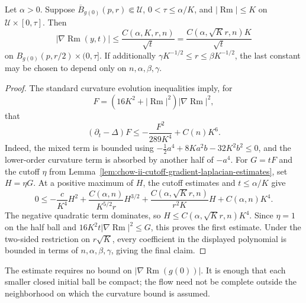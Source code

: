 \begin{theorem}
\label{thm:chow-ii-shi-local-first-derivative-estimate}
Let \(\alpha>0\).  Suppose \(\overline B_{g(0)}(p,r)\Subset\mathcal U\),
\(0<\tau\le\alpha/K\), and \(|\operatorname{Rm}|\le K\) on
\(\mathcal U\times[0,\tau]\).  Then
\[
|\nabla\operatorname{Rm}(y,t)|\le
\frac{C(\alpha,K,r,n)}{\sqrt t}
=\frac{C(\alpha,\sqrt K r,n)K}{\sqrt t}
\]
on \(B_{g(0)}(p,r/2)\times(0,\tau]\).  If additionally
\(\gamma K^{-1/2}\le r\le\beta K^{-1/2}\), the last constant may be chosen
to depend only on \(n,\alpha,\beta,\gamma\).
\end{theorem}
\begin{proof}
The standard curvature evolution inequalities imply, for
\[
F=(16K^2+|\operatorname{Rm}|^2)|\nabla\operatorname{Rm}|^2,
\]
that
\[
(\partial_t-\Delta)F\le-\frac{F^2}{289K^4}+C(n)K^6.
\]
Indeed, the mixed term is bounded using
\(-\tfrac12a^4+8Ka^2b-32K^2b^2\le0\), and the lower-order curvature term is
absorbed by another half of \(-a^4\).  For \(G=tF\) and the cutoff \(\eta\)
from Lemma~\ref{lem:chow-ii-cutoff-gradient-laplacian-estimates}, set
\(H=\eta G\).  At a positive maximum of \(H\), the cutoff estimates and
\(t\le\alpha/K\) give
\[
0\le-\frac c{K^4}H^2
+\frac{C(\alpha,n)}{K^{5/2}r}H^{3/2}
+\frac{C(\alpha,\sqrt K r,n)}{r^2K}H+C(\alpha,n)K^4.
\]
The negative quadratic term dominates, so
\(H\le C(\alpha,\sqrt K r,n)K^4\).  Since \(\eta=1\) on the half ball and
\(16K^2t|\nabla\operatorname{Rm}|^2\le G\), this proves the first estimate.  Under the
two-sided restriction on \(r\sqrt K\), every coefficient in the displayed
polynomial is bounded in terms of \(n,\alpha,\beta,\gamma\), giving the final
claim.
\end{proof}

\begin{remark}
\label{rem:chow-ii-local-first-estimate-initial-data}
The estimate requires no bound on \(|\nabla\operatorname{Rm}(g(0))|\).  It is enough that
each smaller closed initial ball be compact; the flow need not be complete
outside the neighborhood on which the curvature bound is assumed.
\end{remark}

